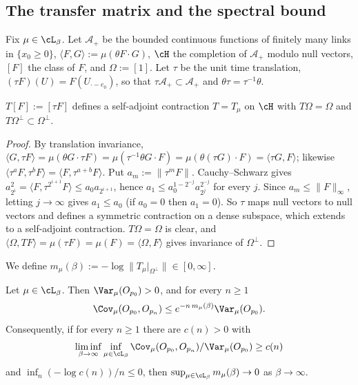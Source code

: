 \subsection{The transfer matrix and the spectral bound}\label{pf:sec-transfer}

Fix $\mu\in\cL_\beta$. Let $\mathcal A_+$ be the bounded continuous functions of finitely many links in $\{x_0\ge0\}$, $\langle F,G\rangle:=\mu(\theta F\cdot G)$, $\cH$ the completion of $\mathcal A_+$ modulo null vectors, $[F]$ the class of $F$, and $\Omega:=[1]$. Let $\tau$ be the unit time translation, $(\tau F)(U)=F(U_{\cdot-e_0})$, so that $\tau\mathcal A_+\subset\mathcal A_+$ and $\theta\tau=\tau^{-1}\theta$.

\begin{lemma}\label{pf:lem-transfer}
$T[F]:=[\tau F]$ defines a self-adjoint contraction $T=T_\mu$ on $\cH$ with $T\Omega=\Omega$ and $T\Omega^\perp\subset\Omega^\perp$.
\end{lemma}

\begin{proof}
By translation invariance, $\langle G,\tau F\rangle=\mu(\theta G\cdot\tau F)=\mu(\tau^{-1}\theta G\cdot F)=\mu(\theta(\tau G)\cdot F)=\langle\tau G,F\rangle$; likewise $\langle\tau^aF,\tau^bF\rangle=\langle F,\tau^{a+b}F\rangle$. Put $a_m:=\|\tau^mF\|$. Cauchy--Schwarz gives $a_{2^i}^2=\langle F,\tau^{2^{i+1}}F\rangle\le a_0a_{2^{i+1}}$, hence $a_1\le a_0^{1-2^{-j}}a_{2^j}^{2^{-j}}$ for every $j$. Since $a_m\le\|F\|_\infty$, letting $j\to\infty$ gives $a_1\le a_0$ (if $a_0=0$ then $a_1=0$). So $\tau$ maps null vectors to null vectors and defines a symmetric contraction on a dense subspace, which extends to a self-adjoint contraction. $T\Omega=\Omega$ is clear, and $\langle\Omega,TF\rangle=\mu(\tau F)=\mu(F)=\langle\Omega,F\rangle$ gives invariance of $\Omega^\perp$.
\end{proof}

We define $m_\mu(\beta):=-\log\|T_\mu|_{\Omega^\perp}\|\in[0,\infty]$.

\begin{proposition}\label{pf:prop-spectral}
Let $\mu\in\cL_\beta$. Then $\Var_\mu(O_{p_0})>0$, and for every $n\ge1$
\begin{equation}\label{pf:eq-S1}
\Cov_\mu(O_{p_0},O_{p_n})\le e^{-n\,m_\mu(\beta)}\Var_\mu(O_{p_0}).
\end{equation}
Consequently, if for every $n\ge1$ there are $c(n)>0$ with
\[\liminf_{\beta\to\infty}\inf_{\mu\in\cL_\beta}\Cov_\mu(O_{p_0},O_{p_n})/\Var_\mu(O_{p_0})\ge c(n)\]
and $\inf_n(-\log c(n))/n\le0$, then $\sup_{\mu\in\cL_\beta}m_\mu(\beta)\to0$ as $\beta\to\infty$.
\end{proposition}

